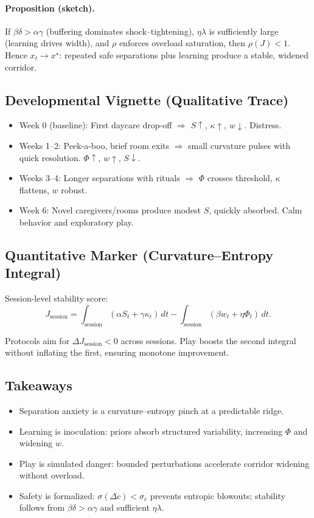 \documentclass{article}
\theoremstyle{definition}
\begin{document}
\paragraph{Proposition (sketch).}  
If $\beta \delta > \alpha \gamma$ (buffering dominates shock–tightening), $\eta \lambda$ is sufficiently large (learning drives width), and $\rho$ enforces overload saturation, then $\rho(J) < 1$. Hence $x_t \to x^\star$: repeated safe separations plus learning produce a stable, widened corridor.

\subsection{Developmental Vignette (Qualitative Trace)}

\begin{itemize}
\item Week 0 (baseline): First daycare drop-off $\Rightarrow$ $S \!\uparrow$, $\kappa \!\uparrow$, $w \!\downarrow$. Distress.
\item Weeks 1–2: Peek-a-boo, brief room exits $\Rightarrow$ small curvature pulses with quick resolution. $\Phi \!\uparrow$, $w \!\uparrow$, $S \!\downarrow$.
\item Weeks 3–4: Longer separations with rituals $\Rightarrow$ $\Phi$ crosses threshold, $\kappa$ flattens, $w$ robust.
\item Week 6: Novel caregivers/rooms produce modest $S$, quickly absorbed. Calm behavior and exploratory play.
\end{itemize}

\subsection{Quantitative Marker (Curvature–Entropy Integral)}

Session-level stability score:
\[
J_{\mathrm{session}} = \int_{\mathrm{session}} (\alpha S_t + \gamma \kappa_t)\, dt
 - \int_{\mathrm{session}} (\beta w_t + \eta \Phi_t)\, dt.
\]

Protocols aim for $\Delta J_{\mathrm{session}} < 0$ across sessions. Play boosts the second integral without inflating the first, ensuring monotone improvement.


\subsection{Takeaways}

\begin{itemize}
\item Separation anxiety is a curvature–entropy pinch at a predictable ridge.  
\item Learning is inoculation: priors absorb structured variability, increasing $\Phi$ and widening $w$.  
\item Play is simulated danger: bounded perturbations accelerate corridor widening without overload.  
\item Safety is formalized: $\sigma(\Delta c) < \sigma_c$ prevents entropic blowouts; stability follows from $\beta \delta > \alpha \gamma$ and sufficient $\eta \lambda$.  
\end{itemize}
\end{document}
